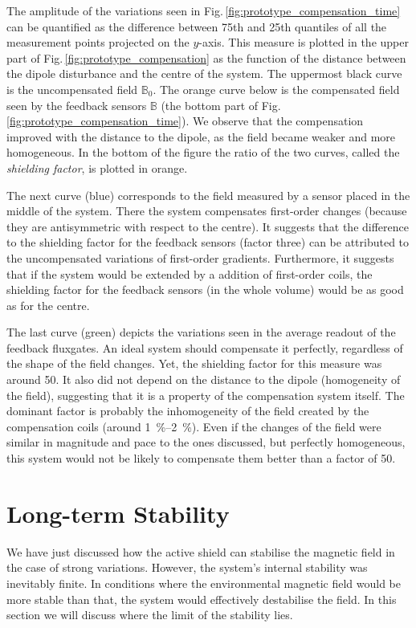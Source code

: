 The amplitude of the variations seen in Fig.\,\ref{fig:prototype_compensation_time} can be quantified as the difference between 75th and 25th quantiles of all the measurement points projected on the $y$-axis.
This measure is plotted in the upper part of Fig.\,\ref{fig:prototype_compensation} as the function of the distance between the dipole disturbance and the centre of the system.
The uppermost black curve is the uncompensated field $\mathbb{B}_0$.
The orange curve below is the compensated field seen by the feedback sensors $\mathbb{B}$ (the bottom part of Fig.\,\ref{fig:prototype_compensation_time}).
We observe that the compensation improved with the distance to the dipole, as the field became weaker and more homogeneous.
In the bottom of the figure the ratio of the two curves, called the \emph{shielding factor}, is plotted in orange.

The next curve (blue) corresponds to the field measured by a sensor placed in the middle of the system.
There the system compensates first-order changes (because they are antisymmetric with respect to the centre).
It suggests that the difference to the shielding factor for the feedback sensors (factor three) can be attributed to the uncompensated variations of first-order gradients.
Furthermore, it suggests that if the system would be extended by a addition of first-order coils, the shielding factor for the feedback sensors (in the whole volume) would be as good as for the centre.

The last curve (green) depicts the variations seen in the average readout of the feedback fluxgates.
An ideal system should compensate it perfectly, regardless of the shape of the field changes.
Yet, the shielding factor for this measure was around 50.
It also did not depend on the distance to the dipole (homogeneity of the field), suggesting that it is a property of the compensation system itself.
The dominant factor is probably the inhomogeneity of the field created by the compensation coils (around \SIrange[range-phrase=--,range-units=single]{1}{2}{\percent}).
Even if the changes of the field were similar in magnitude and pace to the ones discussed, but perfectly homogeneous, this system would not be likely to compensate them better than a factor of 50.



\newpage
\section{Long-term Stability}
We have just discussed how the active shield can stabilise the magnetic field in the case of strong variations.
However, the system's internal stability was inevitably finite. In conditions where the environmental magnetic field would be more stable than that, the system would effectively destabilise the field.
In this section we will discuss where the limit of the stability lies.

